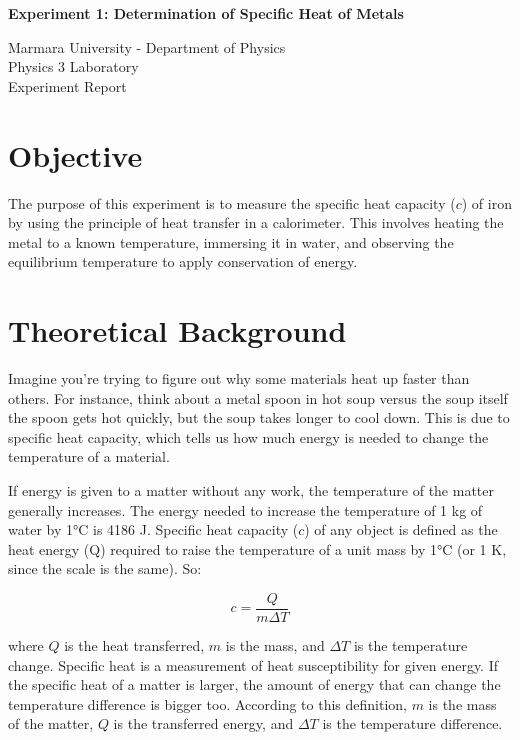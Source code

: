 \documentclass[12pt, a4paper]{article}
\begin{document}
\begin{center}
	\Large \textbf{Experiment 1: Determination of Specific Heat of Metals}
	\vspace{0.5cm}
	    
	\normalsize Marmara University - Department of Physics \\
	Physics 3 Laboratory \\
	Experiment Report
	\vspace{0.5cm}
\end{center}

\section{Objective}
The purpose of this experiment is to measure the specific heat capacity ($c$) of iron by using the principle of heat transfer in a calorimeter. This involves heating the metal to a known temperature, immersing it in water, and observing the equilibrium temperature to apply conservation of energy.

\section{Theoretical Background}
Imagine you're trying to figure out why some materials heat up faster than others. For instance, think about a metal spoon in hot soup versus the soup itself the spoon gets hot quickly, but the soup takes longer to cool down. This is due to specific heat capacity, which tells us how much energy is needed to change the temperature of a material.

If energy is given to a matter without any work, the temperature of the matter generally increases. The energy needed to increase the temperature of 1 kg of water by 1°C is 4186 J. Specific heat capacity ($c$) of any object is defined as the heat energy (Q) required to raise the temperature of a unit mass by 1°C (or 1 K, since the scale is the same). So:

\[ c = \frac{Q}{m \Delta T} \]

where $Q$ is the heat transferred, $m$ is the mass, and $\Delta T$ is the temperature change. Specific heat is a measurement of heat susceptibility for given energy. If the specific heat of a matter is larger, the amount of energy that can change the temperature difference is bigger too. According to this definition, $m$ is the mass of the matter, $Q$ is the transferred energy, and $\Delta T$ is the temperature difference.
\end{document}
